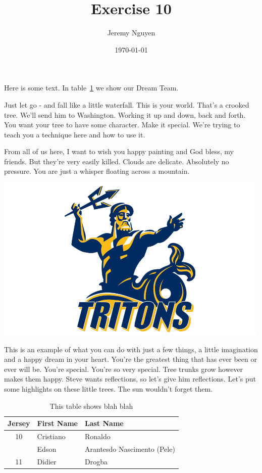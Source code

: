 \documentclass[11pt]{article}
\begin{document}
\title{Exercise 10}
\author{Jeremy Nguyen}
\date{\today}
\maketitle

Here is some text. In table~\ref{dreamteam} we show our Dream Team.

Just let go - and fall like a little waterfall. This is your world. That's a
crooked tree. We'll send him to Washington. Working it up and down, back and
forth. You want your tree to have some character. Make it special. We're trying
to teach you a technique here and how to use it.

From all of us here, I want to wish you happy painting and God bless, my
friends. But they're very easily killed. Clouds are delicate. Absolutely no
pressure. You are just a whisper floating across a mountain.

\includegraphics[trim= 7cm 6cm 8cm 1cm,clip ]{images/triton.png}

This is an example of what you can do with just a few things, a little
imagination and a happy dream in your heart. You're the greatest thing that has
ever been or ever will be. You're special. You're so very special. Tree trunks
grow however makes them happy. Steve wants reflections, so let's give him
reflections. Let's put some highlights on these little trees. The sun wouldn't
forget them.

\begin{table}[b]
	\begin{center}
		\begin{tabular}{c||l|p{1in}}
			Jersey & First Name & Last Name                            \\
			\hline\hline
			10     & Cristiano  & Ronaldo                              \\
			\cline{2-3}
			       & Edson      & Arantes\newline do Nascimento (Pele) \\
			\hline
			11     & Didier     & Drogba                               \\
		\end{tabular}
	\end{center}
	\caption{ \label{dreamteam}
		This table shows blah blah}
\end{table}
\end{document}
